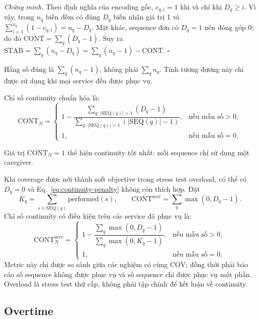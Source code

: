 \documentclass[12pt,a4paper]{article}
\newcommand{\STAB}{\mathrm{STAB}}
\newcommand{\CONT}{\mathrm{CONT}}
\newcommand{\COV}{\mathrm{COV}}
\newcommand{\SEQ}{\mathrm{SEQ}}
\begin{document}
\emph{Chứng minh.} Theo định nghĩa của encoding gốc,
$c_{q,i}=1$ khi và chỉ khi $D_q\geq i$. Vì vậy, trong $n_q$ biến đếm có đúng
$D_q$ biến nhận giá trị 1 và
$\sum_{i=1}^{n_q}(1-c_{q,i})=n_q-D_q$. Mặt khác, sequence đơn có
$D_q=1$ nên đóng góp 0; do đó
$\CONT=\sum_q(D_q-1)$. Suy ra
$\STAB=\sum_q(n_q-D_q)=\sum_q(n_q-1)-\CONT$. \hfill$\square$

Hằng số đúng là $\sum_q(n_q-1)$, không phải $\sum_q n_q$. Tính tương đương
này chỉ được sử dụng khi mọi service đều được phục vụ.

Chỉ số continuity chuẩn hóa là:
\begin{equation}
  \CONT_N=
  \begin{cases}
    1-\dfrac{\sum_{q:\,|\SEQ(q)|>1}(D_q-1)}
                 {\sum_{q:\,|\SEQ(q)|>1}(|\SEQ(q)|-1)},
       & \text{nếu mẫu số}>0,\\[1.1em]
    1, & \text{nếu mẫu số}=0.
  \end{cases}
  \label{eq:continuity-normalized}
\end{equation}

Giá trị $\CONT_N=1$ thể hiện continuity tốt nhất: mỗi sequence chỉ sử dụng một
caregiver.

Khi coverage được nới thành soft objective trong stress test overload, có thể
có $D_q=0$ và Eq.~\eqref{eq:continuity-penalty} không còn thích hợp. Đặt
\begin{equation}
  K_q=\sum_{s\in\SEQ(q)}\mathrm{performed}(s),
  \qquad
  \CONT^{\mathrm{serv}}=\sum_q\max(0,D_q-1).
\end{equation}
Chỉ số continuity có điều kiện trên các service đã phục vụ là:
\begin{equation}
  \CONT_N^{\mathrm{serv}}=
  \begin{cases}
    1-\dfrac{\sum_q\max(0,D_q-1)}
                   {\sum_q\max(0,K_q-1)},
      & \text{nếu mẫu số}>0,\\[1.1em]
    1, & \text{nếu mẫu số}=0.
  \end{cases}
  \label{eq:continuity-served}
\end{equation}
Metric này chỉ được so sánh giữa các nghiệm có cùng $\COV$; đồng thời phải báo
cáo số sequence không được phục vụ và số sequence chỉ được phục vụ một phần.
Overload là stress test thứ cấp, không phải tập chính để kết luận về continuity.

\subsection{Overtime}
\end{document}
